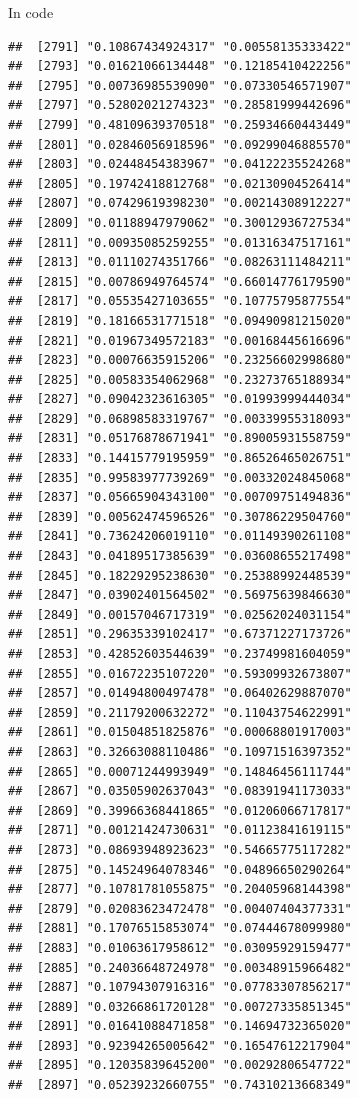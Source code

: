 \documentclass[ignorenonframetext,]{beamer}
\begin{document}
\begin{frame}[fragile]{In code}
\begin{verbatim}
##  [2791] "0.10867434924317" "0.00558135333422"
##  [2793] "0.01621066134448" "0.12185410422256"
##  [2795] "0.00736985539090" "0.07330546571907"
##  [2797] "0.52802021274323" "0.28581999442696"
##  [2799] "0.48109639370518" "0.25934660443449"
##  [2801] "0.02846056918596" "0.09299046885570"
##  [2803] "0.02448454383967" "0.04122235524268"
##  [2805] "0.19742418812768" "0.02130904526414"
##  [2807] "0.07429619398230" "0.00214308912227"
##  [2809] "0.01188947979062" "0.30012936727534"
##  [2811] "0.00935085259255" "0.01316347517161"
##  [2813] "0.01110274351766" "0.08263111484211"
##  [2815] "0.00786949764574" "0.66014776179590"
##  [2817] "0.05535427103655" "0.10775795877554"
##  [2819] "0.18166531771518" "0.09490981215020"
##  [2821] "0.01967349572183" "0.00168445616696"
##  [2823] "0.00076635915206" "0.23256602998680"
##  [2825] "0.00583354062968" "0.23273765188934"
##  [2827] "0.09042323616305" "0.01993999444034"
##  [2829] "0.06898583319767" "0.00339955318093"
##  [2831] "0.05176878671941" "0.89005931558759"
##  [2833] "0.14415779195959" "0.86526465026751"
##  [2835] "0.99583977739269" "0.00332024845068"
##  [2837] "0.05665904343100" "0.00709751494836"
##  [2839] "0.00562474596526" "0.30786229504760"
##  [2841] "0.73624206019110" "0.01149390261108"
##  [2843] "0.04189517385639" "0.03608655217498"
##  [2845] "0.18229295238630" "0.25388992448539"
##  [2847] "0.03902401564502" "0.56975639846630"
##  [2849] "0.00157046717319" "0.02562024031154"
##  [2851] "0.29635339102417" "0.67371227173726"
##  [2853] "0.42852603544639" "0.23749981604059"
##  [2855] "0.01672235107220" "0.59309932673807"
##  [2857] "0.01494800497478" "0.06402629887070"
##  [2859] "0.21179200632272" "0.11043754622991"
##  [2861] "0.01504851825876" "0.00068801917003"
##  [2863] "0.32663088110486" "0.10971516397352"
##  [2865] "0.00071244993949" "0.14846456111744"
##  [2867] "0.03505902637043" "0.08391941173033"
##  [2869] "0.39966368441865" "0.01206066717817"
##  [2871] "0.00121424730631" "0.01123841619115"
##  [2873] "0.08693948923623" "0.54665775117282"
##  [2875] "0.14524964078346" "0.04896650290264"
##  [2877] "0.10781781055875" "0.20405968144398"
##  [2879] "0.02083623472478" "0.00407404377331"
##  [2881] "0.17076515853074" "0.07444678099980"
##  [2883] "0.01063617958612" "0.03095929159477"
##  [2885] "0.24036648724978" "0.00348915966482"
##  [2887] "0.10794307916316" "0.07783307856217"
##  [2889] "0.03266861720128" "0.00727335851345"
##  [2891] "0.01641088471858" "0.14694732365020"
##  [2893] "0.92394265005642" "0.16547612217904"
##  [2895] "0.12035839645200" "0.00292806547722"
##  [2897] "0.05239232660755" "0.74310213668349"

\end{verbatim}
\end{frame}
\end{document}
